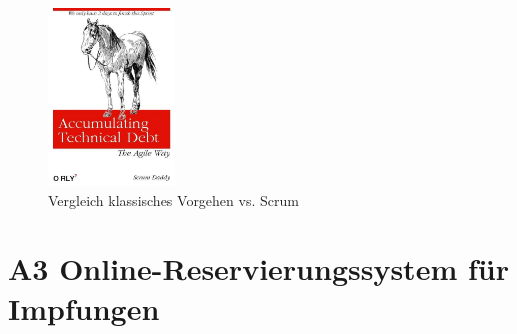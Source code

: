 \documentclass[12pt]{article}
\begin{document}
\begin{figure}[H]
    \centering
    \includegraphics[width=0.3\textwidth]{technical_dept.jpeg}
    \caption{Vergleich klassisches Vorgehen vs. Scrum}
\end{figure}

\newpage
\section*{A3 Online-Reservierungssystem für Impfungen}
\end{document}
